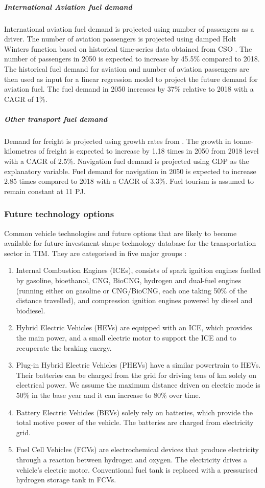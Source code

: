\documentclass[gmd,manuscript]{copernicus}
\begin{document}
\subparagraph{International Aviation fuel demand}
International aviation fuel demand is projected using number of passengers as a driver. The number of aviation passengers is projected using damped Holt Winters function based on historical time-series data obtained from CSO \citep{Dantas2017,Grubb2001}. The number of passengers in 2050 is expected to increase by 45.5\% compared to 2018. The historical fuel demand for aviation and number of aviation passengers are then used as input for a linear regression model to project the future demand for aviation fuel. The fuel demand in 2050 increases by 37\% relative to 2018 with a CAGR of 1\%. 

\subparagraph{Other transport fuel demand}
Demand for freight is projected using growth rates from \citet {AECOMIrelandLimited2019}. The growth in tonne-kilometres of freight is expected to increase by 1.18 times in 2050 from 2018 level with a CAGR of 2.5\%. Navigation fuel demand is projected using GDP as the explanatory variable. Fuel demand for navigation in 2050 is expected to increase 2.85 times compared to 2018 with a CAGR of 3.3\%. Fuel tourism is assumed to remain constant at 11 PJ. 

\subsubsection{Future technology options}

Common vehicle technologies and future options that are likely to become available for future investment shape technology database for the transportation sector in TIM. They are categorised in five major groups \citep{Aryanpur2015}:

\begin{enumerate}
 \item Internal Combustion Engines (ICEs), consists of spark ignition engines fuelled by gasoline, bioethanol, CNG, BioCNG, hydrogen and dual-fuel engines (running either on gasoline or CNG/BioCNG, each one taking 50\% of the distance travelled), and compression ignition engines powered by diesel and biodiesel. 
\item Hybrid Electric Vehicles (HEVs) are equipped with an ICE, which provides the main power, and a small electric motor to support the ICE and to recuperate the braking energy. 
\item Plug-in Hybrid Electric Vehicles (PHEVs) have a similar powertrain to HEVs. Their batteries can be charged from the grid for driving tens of km solely on electrical power. We assume the maximum distance driven on electric mode is 50\% in the base year and it can increase to 80\% over time. 
\item Battery Electric Vehicles (BEVs) solely rely on batteries, which provide the total motive power of the vehicle. The batteries are charged from electricity grid. 
\item Fuel Cell Vehicles (FCVs) are electrochemical devices that produce electricity through a reaction between hydrogen and oxygen. The electricity drives a vehicle’s electric motor. Conventional fuel tank is replaced with a pressurised hydrogen storage tank in FCVs. 
\end{enumerate}
\end{document}
